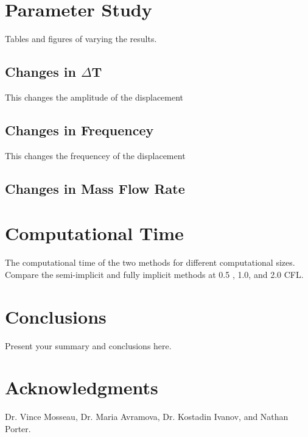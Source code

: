 \documentclass{mc2015}
\begin{document}
\section{Parameter Study}

Tables and figures of varying the results.

\subsection{Changes in $\Delta$T}

This changes the amplitude of the displacement

\subsection{Changes in Frequencey}

This changes the frequencey of the displacement

\subsection{Changes in Mass Flow Rate}

\section{Computational Time}

The computational time of the two methods for different computational sizes.
Compare the semi-implicit and fully implicit methods at 0.5 , 1.0, and 2.0 CFL. 

\section{Conclusions}

Present your summary and conclusions here.

\section{Acknowledgments}

Dr. Vince Mosseau, Dr. Maria Avramova, Dr. Kostadin Ivanov, and Nathan Porter.

\setlength{\baselineskip}{12pt}





\end{document}
